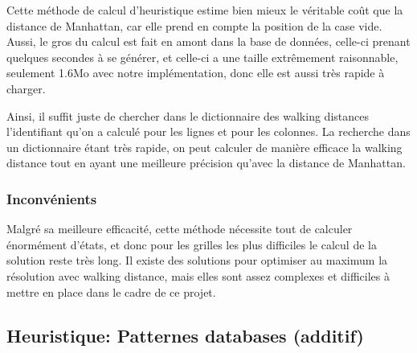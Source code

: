 \documentclass[a4paper, 12pt]{article}
\begin{document}
Cette méthode de calcul d'heuristique estime bien mieux le véritable coût que la distance de Manhattan, car elle prend en compte la position de la case vide. Aussi, le gros du calcul est fait en amont dans la base de données, celle-ci prenant quelques secondes à se générer, et celle-ci a une taille extrêmement raisonnable, seulement 1.6Mo avec notre implémentation, donc elle est aussi très rapide à charger.

Ainsi, il suffit juste de chercher dans le dictionnaire des walking distances l'identifiant qu'on a calculé pour les lignes et pour les colonnes.
La recherche dans un dictionnaire étant très rapide, on peut calculer de manière efficace la walking distance tout en ayant une meilleure précision qu'avec la distance de Manhattan.

\subsubsection{Inconvénients}

Malgré sa meilleure efficacité, cette méthode nécessite tout de calculer énormément d'états, et donc pour les grilles les plus difficiles le calcul de la solution reste très long.
Il existe des solutions pour optimiser au maximum la résolution avec walking distance, mais elles sont assez complexes et difficiles à mettre en place dans le cadre de ce projet.

\subsection{Heuristique: Patternes databases (additif)}
\end{document}
